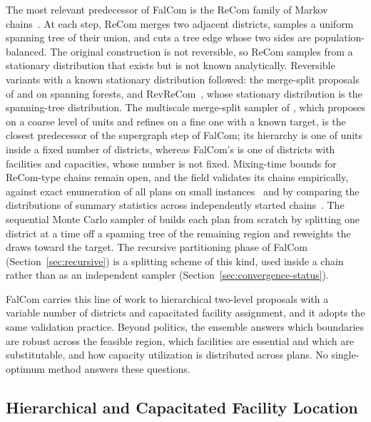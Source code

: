 \documentclass[preprint,12pt,authoryear]{elsarticle}
\theoremstyle{definition}
\begin{document}
The most relevant predecessor of FalCom is the ReCom family of Markov chains~\citep{deford2021recombination}. At each step, ReCom merges two adjacent districts, samples a uniform spanning tree of their union, and cuts a tree edge whose two sides are population-balanced. The original construction is not reversible, so ReCom samples from a stationary distribution that exists but is not known analytically. Reversible variants with a known stationary distribution followed: the merge-split proposals of \citet{carter2019mergesplit} and \citet{autry2023forest} on spanning forests, and RevReCom~\citep{cannon2026spanning}, whose stationary distribution is the spanning-tree distribution. The multiscale merge-split sampler of \citet{autry2021multiscale}, which proposes on a coarse level of units and refines on a fine one with a known target, is the closest predecessor of the supergraph step of FalCom; its hierarchy is one of units inside a fixed number of districts, whereas FalCom's is one of districts with facilities and capacities, whose number is not fixed. Mixing-time bounds for ReCom-type chains remain open, and the field validates its chains empirically, against exact enumeration of all plans on small instances~\citep{fifield2020essential, cannon2026spanning} and by comparing the distributions of summary statistics across independently started chains~\citep{deford2021recombination}. The sequential Monte Carlo sampler of \citet{mccartan2023sequential} builds each plan from scratch by splitting one district at a time off a spanning tree of the remaining region and reweights the draws toward the target. The recursive partitioning phase of FalCom (Section~\ref{sec:recursive}) is a splitting scheme of this kind, used inside a chain rather than as an independent sampler (Section~\ref{sec:convergence-status}).

FalCom carries this line of work to hierarchical two-level proposals with a variable number of districts and capacitated facility assignment, and it adopts the same validation practice. Beyond politics, the ensemble answers which boundaries are robust across the feasible region, which facilities are essential and which are substitutable, and how capacity utilization is distributed across plans. No single-optimum method answers these questions.

\subsection{Hierarchical and Capacitated Facility Location}
\label{sec:hcfl}
\end{document}
